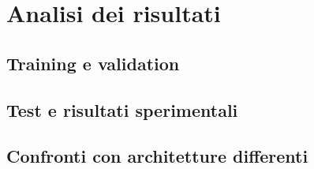 \chapter{Analisi dei risultati}

\section{Training e validation}

\section{Test e risultati sperimentali}

\section{Confronti con architetture differenti}
